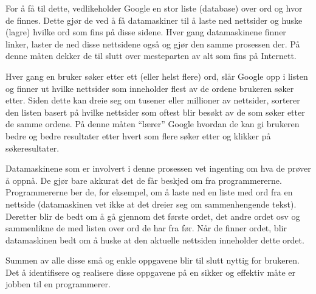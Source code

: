 For å få til dette, vedlikeholder Google en stor liste (database) over ord og hvor de finnes. Dette gjør de ved å få datamaskiner til å laste ned nettsider og huske (lagre) hvilke ord som fins på disse sidene. Hver gang datamaskinene finner linker, laster de ned disse nettsidene også og gjør den samme prosessen der. På denne måten dekker de til slutt over mesteparten av alt som fins på Internett.

Hver gang en bruker søker etter ett (eller helst flere) ord, slår Google opp i listen og finner ut hvilke nettsider som inneholder flest av de ordene brukeren søker etter. Siden dette kan dreie seg om tusener eller millioner av nettsider, sorterer den listen basert på hvilke nettsider som oftest blir besøkt av de som søker etter de samme ordene. På denne måten ``lærer'' Google hvordan de kan gi brukeren bedre og bedre resultater etter hvert som flere søker etter og klikker på søkeresultater.

Datamaskinene som er involvert i denne prosessen vet ingenting om hva de prøver å oppnå. De gjør bare akkurat det de får beskjed om fra programmererne. Programmererne ber de, for eksempel, om å laste ned en liste med ord fra en nettside (datamaskinen vet ikke at det dreier seg om sammenhengende tekst). Deretter blir de bedt om å gå gjennom det første ordet, det andre ordet osv og sammenlikne de med listen over ord de har fra før. Når de finner ordet, blir datamaskinen bedt om å huske at den aktuelle nettsiden inneholder dette ordet.

Summen av alle disse små og enkle oppgavene blir til slutt nyttig for brukeren. Det å identifisere og realisere disse oppgavene på en sikker og effektiv måte er jobben til en programmerer.